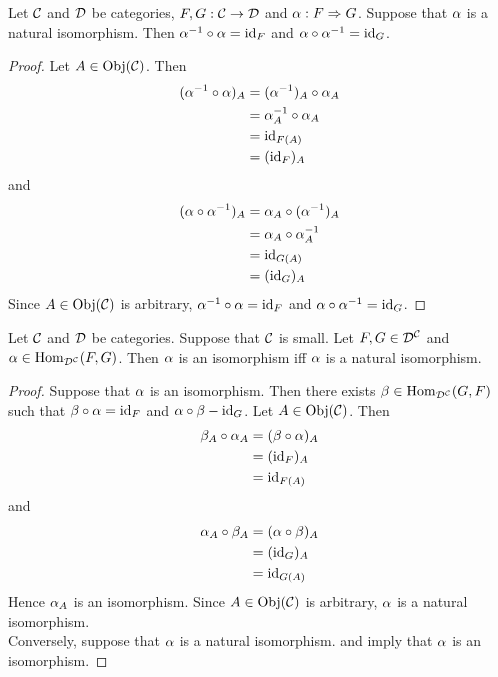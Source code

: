 \documentclass{book}
\begin{document}
	\begin{ex} 
		Let $\mathcal{C}$ and $\mathcal{D}$ be categories, $F,G: \mathcal{C} \rightarrow \mathcal{D}$ and $\alpha : F \Rightarrow G$. Suppose that $\alpha$ is a natural isomorphism. Then $\alpha^{-1} \circ \alpha = \operatorname{id}_{F}$ and $\alpha \circ \alpha^{-1} = \operatorname{id}_G$.
	\end{ex}

	\begin{proof}
		Let $A \in \operatorname{Obj}(\mathcal{C})$. Then 
		\begin{align*}
			(\alpha^{-1} \circ \alpha )_A 
			& = (\alpha^{-1})_A \circ \alpha_A \\
			& = \alpha_A^{-1} \circ \alpha_A \\
			& = \operatorname{id}_{F(A)} \\
			& = (\operatorname{id}_F)_A
		\end{align*}
		and 
			\begin{align*}
			(\alpha \circ \alpha^{-1} )_A 
			& = \alpha_A \circ (\alpha^{-1})_A\\
			& = \alpha_A \circ \alpha_A^{-1}\\
			& = \operatorname{id}_{G(A)} \\
			& = (\operatorname{id}_G)_A
		\end{align*}
		Since $A \in \operatorname{Obj}(\mathcal{C})$ is arbitrary, $\alpha^{-1} \circ \alpha = \operatorname{id}_F$ and $\alpha \circ \alpha^{-1} = \operatorname{id}_G$.
	\end{proof}

	\begin{ex} 
		Let $\mathcal{C}$ and $\mathcal{D}$ be categories. Suppose that $\mathcal{C}$ is small. Let $F,G \in \mathcal{D}^{\mathcal{C}}$ and $\alpha \in \operatorname{Hom}_{\mathcal{D}^{\mathcal{C}}}(F, G)$. Then $\alpha$ is an isomorphism iff $\alpha$ is a natural isomorphism.  
	\end{ex}

	\begin{proof}
		Suppose that $\alpha$ is an isomorphism. Then there exists $\beta \in \operatorname{Hom}_{\mathcal{D}^{\mathcal{C}}}(G, F)$ such that $\beta \circ \alpha = \operatorname{id}_F$ and $\alpha \circ \beta - \operatorname{id}_G$. Let $A \in \operatorname{Obj}(\mathcal{C})$. Then
		\begin{align*}
			\beta_A \circ \alpha_A 
			& = (\beta \circ \alpha)_A \\
			& = (\operatorname{id}_F)_A \\
			& = \operatorname{id}_{F(A)}
		\end{align*}
		and 
		\begin{align*}
			\alpha_A \circ \beta_A
			& = (\alpha \circ \beta)_A \\
			& = (\operatorname{id}_G)_A \\
			& = \operatorname{id}_{G(A)}
		\end{align*}
		Hence $\alpha_A$ is an isomorphism. Since $A \in \operatorname{Obj}(\mathcal{C})$ is arbitrary, $\alpha$ is a natural isomorphism. \\
		Conversely, suppose that $\alpha$ is a natural isomorphism.  and  imply that $\alpha$ is an isomorphism.
	\end{proof}
\end{document}
